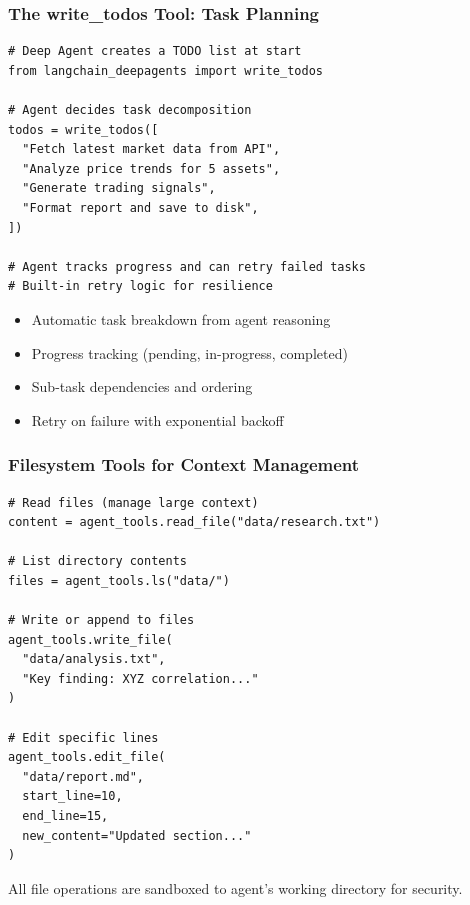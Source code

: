 \documentclass[aspectratio=169,11pt]{beamer}
\begin{document}
\begin{frame}[fragile]
\frametitle{The write\_todos Tool: Task Planning}

\begin{lstlisting}
# Deep Agent creates a TODO list at start
from langchain_deepagents import write_todos

# Agent decides task decomposition
todos = write_todos([
  "Fetch latest market data from API",
  "Analyze price trends for 5 assets",
  "Generate trading signals",
  "Format report and save to disk",
])

# Agent tracks progress and can retry failed tasks
# Built-in retry logic for resilience
\end{lstlisting}

\vspace{1em}
\begin{conceptbox}
\begin{itemize}
    \setlength{\itemsep}{1pt}
  \item Automatic task breakdown from agent reasoning
  \item Progress tracking (pending, in-progress, completed)
  \item Sub-task dependencies and ordering
  \item Retry on failure with exponential backoff
\end{itemize}
\end{conceptbox}

\end{frame}

\begin{frame}[fragile]
\frametitle{Filesystem Tools for Context Management}

\begin{lstlisting}
# Read files (manage large context)
content = agent_tools.read_file("data/research.txt")

# List directory contents
files = agent_tools.ls("data/")

# Write or append to files
agent_tools.write_file(
  "data/analysis.txt",
  "Key finding: XYZ correlation..."
)

# Edit specific lines
agent_tools.edit_file(
  "data/report.md",
  start_line=10,
  end_line=15,
  new_content="Updated section..."
)
\end{lstlisting}

\vspace{0.8em}
\begin{warningbox}
All file operations are sandboxed to agent's working directory for security.
\end{warningbox}

\end{frame}
\end{document}
